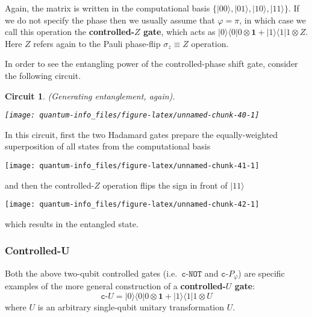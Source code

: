\documentclass[fleqn]{article}
\newtheorem*{circuit}{Circuit}
\begin{document}
Again, the matrix is written in the computational basis \(\{|00\rangle,|01\rangle,|10\rangle,|11\rangle\}\).
If we do not specify the phase then we usually assume that \(\varphi=\pi\), in which case we call this operation the \textbf{controlled-\(Z\) gate}, which acts as \(|0\rangle\langle 0|0\otimes\mathbf{1}+ |1\rangle\langle 1|1\otimes Z\).
Here \(Z\) refers again to the Pauli phase-flip \(\sigma_z\equiv Z\) operation.

In order to see the entangling power of the controlled-phase shift gate, consider the following circuit.

\begin{circuit}

(Generating entanglement, again).

\begin{center}\texttt{[image: quantum-info\_files/figure-latex/unnamed-chunk-40-1]} \end{center}

\end{circuit}

In this circuit, first the two Hadamard gates prepare the equally-weighted superposition of all states from the computational basis

\begin{center}\texttt{[image: quantum-info\_files/figure-latex/unnamed-chunk-41-1]} \end{center}

and then the controlled-\(Z\) operation flips the sign in front of \(|11\rangle\)

\begin{center}\texttt{[image: quantum-info\_files/figure-latex/unnamed-chunk-42-1]} \end{center}

which results in the entangled state.

\hypertarget{controlled-u}{%
\subsubsection{Controlled-U}\label{controlled-u}}

Both the above two-qubit controlled gates (i.e.~\(\texttt{c-NOT}\) and \(\texttt{c-}P_\varphi\)) are specific examples of the more general construction of a \textbf{controlled-\(U\) gate}:
\[
  \texttt{c-}U
  =
  |0\rangle\langle 0|0\otimes\mathbf{1}+ |1\rangle\langle 1|1\otimes U
\]
where \(U\) is an arbitrary single-qubit unitary transformation \(U\).
\end{document}
